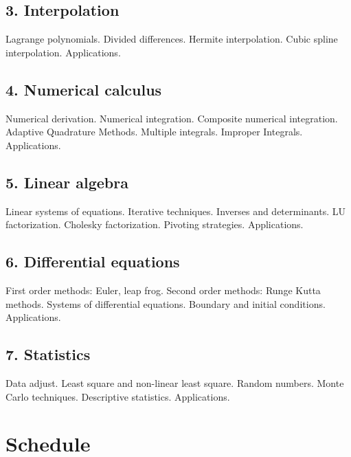 \documentclass[a4,useAMS,usenatbib,usegraphicx,12pt]{article}
\begin{document}
\subsection*{3. Interpolation}
Lagrange polynomials. Divided differences. Hermite interpolation. Cubic spline
interpolation. Applications.

\subsection*{4. Numerical calculus}
Numerical derivation. Numerical integration. Composite numerical integration.
Adaptive Quadrature Methods. Multiple integrals. Improper Integrals. 
Applications.

\subsection*{5. Linear algebra}
Linear systems of equations. Iterative techniques. Inverses and determinants.
LU factorization. Cholesky factorization. Pivoting strategies. Applications.

\subsection*{6. Differential equations}
First order methods: Euler, leap frog. Second order methods: Runge Kutta methods.
Systems of differential equations. Boundary and initial conditions. Applications.

\subsection*{7. Statistics}
Data adjust. Least square and non-linear least square. Random numbers. Monte 
Carlo techniques. Descriptive statistics. Applications.

\newpage
\section*{Schedule}
\end{document}
